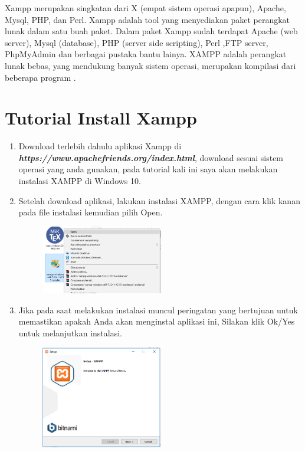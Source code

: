 Xampp merupakan singkatan dari X (empat sistem operasi apapun), Apache, Mysql, PHP, dan Perl. Xampp adalah tool yang menyediakan paket perangkat lunak dalam satu buah paket. Dalam paket Xampp sudah terdapat Apache (web server), Mysql (database), PHP (server side scripting), Perl ,FTP server, PhpMyAdmin dan berbagai pustaka bantu lainya. XAMPP adalah perangkat lunak bebas, yang mendukung banyak sistem operasi, merupakan kompilasi dari beberapa program \cite{sugiarto2019aplikasi}.

\section{Tutorial Install Xampp}
\begin{enumerate}
    \item Download terlebih dahulu aplikasi Xampp di \textbf{\textit{https://www.apachefriends.org/index.html}}, download sesuai sistem operasi yang anda gunakan, pada tutorial kali ini saya akan melakukan instalasi XAMPP di Windows 10.
    
	\item Setelah download aplikasi, lakukan instalasi XAMPP, dengan cara klik kanan pada file instalasi kemudian pilih Open.
		\begin{figure}[!htbp]
    		\centering
    		\includegraphics[width=0.5\textwidth]{figures/Xampp2.png}
    		\label{Xampp2}
		\end{figure}
		
	\item Jika pada saat melakukan instalasi muncul peringatan yang bertujuan untuk memastikan apakah Anda akan menginstal aplikasi ini, Silakan klik Ok/Yes untuk melanjutkan instalasi.
		\begin{figure}[!htbp]
    		\centering
    		\includegraphics[width=0.5\textwidth]{figures/Xampp3.PNG}
    		\label{Xampp3}
		\end{figure}
		

\end{enumerate}
